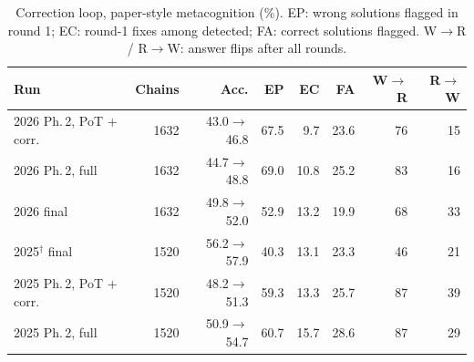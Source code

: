\begin{table}[!t]
\centering
\scriptsize
\caption{Correction loop, paper-style metacognition (\%). EP: wrong solutions flagged in round 1; EC: round-1 fixes among detected; FA: correct solutions flagged. W$\to$R / R$\to$W: answer flips after all rounds.}
\label{tab:corr}
\setlength{\tabcolsep}{2.5pt}
\begin{tabular}{lrrrrrrr}
\toprule
Run & Chains & Acc. & EP & EC & FA & W$\to$R & R$\to$W \\
\midrule
2026 Ph.\,2, PoT + corr. & 1632 & 43.0$\to$46.8 & 67.5 & 9.7 & 23.6 & 76 & 15 \\
2026 Ph.\,2, full & 1632 & 44.7$\to$48.8 & 69.0 & 10.8 & 25.2 & 83 & 16 \\
2026 final & 1632 & 49.8$\to$52.0 & 52.9 & 13.2 & 19.9 & 68 & 33 \\
2025$^\dagger$ final & 1520 & 56.2$\to$57.9 & 40.3 & 13.1 & 23.3 & 46 & 21 \\
2025 Ph.\,2, PoT + corr. & 1520 & 48.2$\to$51.3 & 59.3 & 13.3 & 25.7 & 87 & 39 \\
2025 Ph.\,2, full & 1520 & 50.9$\to$54.7 & 60.7 & 15.7 & 28.6 & 87 & 29 \\
\bottomrule
\end{tabular}
\end{table}
